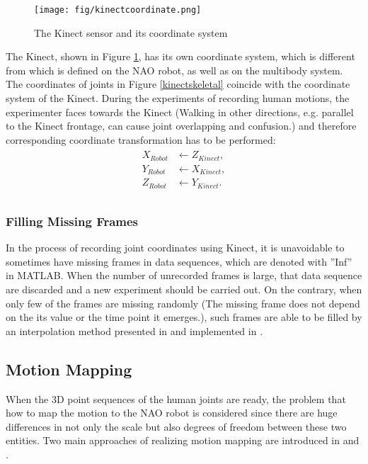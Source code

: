 \begin{figure}[H]
	\centering
	\texttt{[image: fig/kinectcoordinate.png]}
	\caption[The Kinect sensor and its coordinate system]{The Kinect sensor and its coordinate system\cite{kinectcoordinate}}
	\label{kinect}
\end{figure}

The Kinect, shown in Figure {\ref{kinect}}, has its own coordinate system, which is different from which is defined on the NAO robot, as well as on the multibody system. The coordinates of joints in Figure {\ref{kinectskeletal}} coincide with the coordinate system of the Kinect. During the experiments of recording human motions, the experimenter faces towards the Kinect (Walking in other directions, e.g. parallel to the Kinect frontage, can cause joint overlapping and confusion.) and therefore corresponding coordinate transformation has to be performed:
\begin{align*}
\begin{split}
	X_{\mathit{Robot}} & \gets Z_{\mathit{Kinect}},\\
	Y_{\mathit{Robot}} & \gets X_{\mathit{Kinect}},\\
	Z_{\mathit{Robot}} & \gets Y_{\mathit{Kinect}}.\\
\end{split}
\end{align*}



\subsubsection{Filling Missing Frames}
In the process of recording joint coordinates using Kinect, it is unavoidable to sometimes have missing frames in data sequences, which are denoted with ''Inf'' in MATLAB. When the number of unrecorded frames is large, that data sequence are discarded and a new experiment should be carried out. On the contrary, when only few of the frames are missing randomly (The missing frame does not depend on the its value or the time point it emerges.), such frames are able to be filled by  an interpolation method presented in \cite{garcia2010robust} and implemented in \cite{inpaintgarcia}.

\subsection{Motion Mapping}
\label{motionmapping}
When the 3D point sequences of the human joints are ready, the problem that how to map the motion to the NAO robot is considered since there are huge differences in not only the scale but also degrees of freedom between these two entities. Two main approaches of realizing motion mapping are introduced in {\cite{koenemann2014real}} and {\cite{almetwally2013real}}. 

